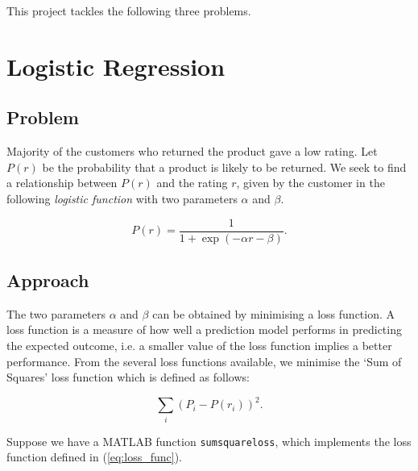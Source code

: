 \documentclass[11pt]{report}
\begin{document}
This project tackles the following three problems. \\

{\let\clearpage\relax \chapter{Logistic Regression}}
\section*{Problem}
Majority of the customers who returned the product gave a low rating. Let $P(r)$ be the probability that a product is likely to be returned. We seek to find a relationship between $P(r)$ and the rating $r$, given by the customer in the following \emph{logistic function} with two parameters $\alpha$ and $\beta$.

\begin{equation}
	P(r) = \frac{1}{1 + \exp(-\alpha r - \beta)}.
\end{equation}

\section{Approach}
The two parameters $\alpha$ and $\beta$ can be obtained by minimising a loss function. A loss function is a measure of how well a prediction model performs in predicting the expected outcome, i.e. a smaller value of the loss function implies a better performance. From the several loss functions available, we minimise the `Sum of Squares' loss function which is defined as follows:

\begin{equation}
	\sum_{i}{(P_i - P(r_i))^2}.
	\label{eq:loss_func}
\end{equation}

Suppose we have a MATLAB function \texttt{sumsquareloss}, which implements the loss function defined in (\ref{eq:loss_func}). \\


\end{document}
